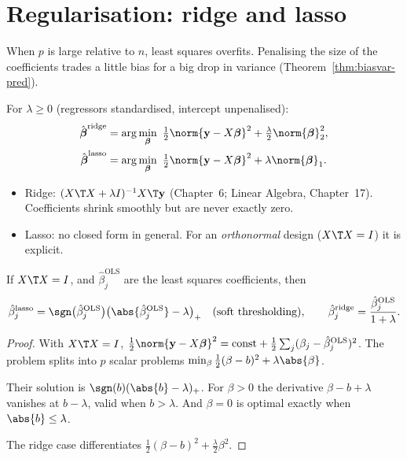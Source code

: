 \section{Regularisation: ridge and lasso}

When $p$ is large relative to $n$, least squares overfits. Penalising the size of the coefficients trades a little bias for a big drop in variance (Theorem~\ref{thm:biasvar-pred}).

\begin{definition}
For $\lambda\ge0$ (regressors standardised, intercept unpenalised):
\begin{align*}
\hat{\boldsymbol\beta}^{\mathrm{ridge}}&=\arg\min_{\boldsymbol\beta}\ \tfrac12\norm{\mathbf{y}-X\boldsymbol\beta}^2+\tfrac\lambda2\norm{\boldsymbol\beta}_2^2,\\
\hat{\boldsymbol\beta}^{\mathrm{lasso}}&=\arg\min_{\boldsymbol\beta}\ \tfrac12\norm{\mathbf{y}-X\boldsymbol\beta}^2+\lambda\norm{\boldsymbol\beta}_1.
\end{align*}
\end{definition}

\begin{itemize}
  \item Ridge: $(X\T X+\lambda I)^{-1}X\T\mathbf{y}$ (Chapter~6; Linear Algebra, Chapter~17). Coefficients shrink smoothly but are never exactly zero.
  \item Lasso: no closed form in general. For an \emph{orthonormal} design ($X\T X=I$) it is explicit.
\end{itemize}

\begin{theorem}\label{thm:lasso}
If $X\T X=I$, and $\hat\beta_j^{\mathrm{OLS}}$ are the least squares coefficients, then
\[ \hat\beta_j^{\mathrm{lasso}}=\sgn\big(\hat\beta_j^{\mathrm{OLS}}\big)\big(\abs{\hat\beta_j^{\mathrm{OLS}}}-\lambda\big)_+\quad\text{(soft thresholding)},\qquad\hat\beta_j^{\mathrm{ridge}}=\frac{\hat\beta_j^{\mathrm{OLS}}}{1+\lambda}. \]
\end{theorem}

\begin{proof}
With $X\T X=I$, $\tfrac12\norm{\mathbf{y}-X\boldsymbol\beta}^2=\text{const}+\tfrac12\sum_j(\beta_j-\hat\beta_j^{\mathrm{OLS}})^2$. The problem splits into $p$ scalar problems $\min_\beta\tfrac12(\beta-b)^2+\lambda\abs{\beta}$.

Their solution is $\sgn(b)(\abs{b}-\lambda)_+$. For $\beta>0$ the derivative $\beta-b+\lambda$ vanishes at $b-\lambda$, valid when $b>\lambda$. And $\beta=0$ is optimal exactly when $\abs{b}\le\lambda$.

The ridge case differentiates $\tfrac12(\beta-b)^2+\tfrac\lambda2\beta^2$.
\end{proof}

